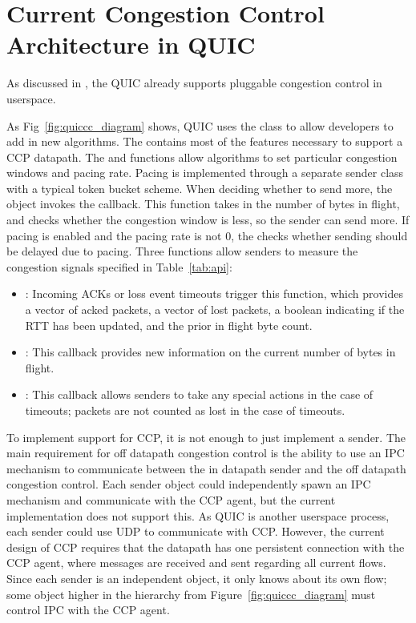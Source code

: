 \section{Current Congestion Control Architecture in QUIC}
As discussed in , the QUIC already supports pluggable congestion control in userspace. 

As Fig~\ref{fig:quiccc_diagram} shows, QUIC uses the  class to allow developers to add in new algorithms.
The  contains most of the features necessary to support a CCP datapath.
The  and  functions allow algorithms to set particular congestion windows and pacing rate.
Pacing is implemented through a separate sender class with a typical token bucket scheme. When deciding whether to send more, the  object invokes the  callback.
This function takes in the number of bytes in flight, and checks whether the congestion window is less, so the sender can send more.
If pacing is enabled and the pacing rate is not 0, the  checks whether sending should be delayed due to pacing.
Three functions allow senders to measure the congestion signals specified in Table~\ref{tab:api}:
\begin{itemize}
	\item {}: Incoming ACKs or loss event timeouts trigger this function, which provides a vector of acked packets, a vector of lost packets, a boolean indicating if the RTT has been updated, and the prior in flight byte count.
	\item {}: This callback provides new information on the current number of bytes in flight.
	\item {}: This callback allows senders to take any special actions in the case of timeouts; packets are not counted as lost in the case of timeouts.
\end{itemize}

To implement support for CCP, it is not enough to just implement a sender.
The main requirement for off datapath congestion control is the ability to use an IPC mechanism to communicate between the in datapath sender and the off datapath congestion control.
Each sender object could independently spawn an IPC mechanism and communicate with the CCP agent, but the current implementation does not support this.
As QUIC is another userspace process, each sender could use UDP to communicate with CCP.
However, the current design of CCP requires that the datapath has one persistent connection with the CCP agent, where messages are received and sent regarding all current flows.
Since each sender is an independent object, it only knows about its own flow; some object higher in the hierarchy from Figure~\ref{fig:quiccc_diagram} must control IPC with the CCP agent.

